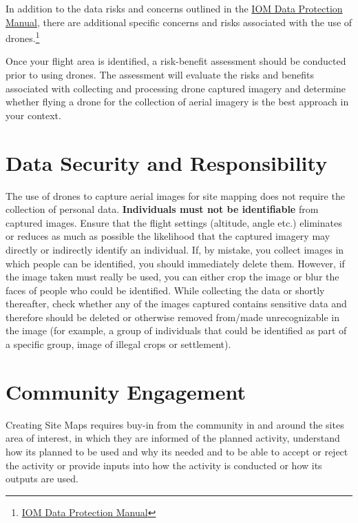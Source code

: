 \documentclass[
  a4paper,
  onecolumn,
  oneside]{book}
\begin{document}
In addition to the data risks and concerns outlined in the
\href{https://publications.iom.int/books/iom-data-protection-manual}{IOM
Data Protection Manual}, there are additional specific concerns and
risks associated with the use of drones.\footnote{\href{https://publications.iom.int/books/iom-data-protection-manual}{IOM
  Data Protection Manual}}

Once your flight area is identified, a risk-benefit assessment should be
conducted prior to using drones. The assessment will evaluate the risks
and benefits associated with collecting and processing drone captured
imagery and determine whether flying a drone for the collection of
aerial imagery is the best approach in your context.

\hypertarget{data-security-and-responsibility}{%
\section{Data Security and
Responsibility}\label{data-security-and-responsibility}}

The use of drones to capture aerial images for site mapping does not
require the collection of personal data. \textbf{Individuals must not be
identifiable} from captured images. Ensure that the flight settings
(altitude, angle etc.) eliminates or reduces as much as possible the
likelihood that the captured imagery may directly or indirectly identify
an individual. If, by mistake, you collect images in which people can be
identified, you should immediately delete them. However, if the image
taken must really be used, you can either crop the image or blur the
faces of people who could be identified. While collecting the data or
shortly thereafter, check whether any of the images captured contains
sensitive data and therefore should be deleted or otherwise removed
from/made unrecognizable in the image (for example, a group of
individuals that could be identified as part of a specific group, image
of illegal crops or settlement).

\hypertarget{community-engagement}{%
\section{Community Engagement}\label{community-engagement}}

Creating Site Maps requires buy-in from the community in and around the
sites area of interest, in which they are informed of the planned
activity, understand how its planned to be used and why its needed and
to be able to accept or reject the activity or provide inputs into how
the activity is conducted or how its outputs are used.
\end{document}

